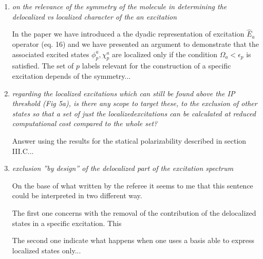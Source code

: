 \documentclass[11pt,a4paper]{article}
\newcommand{\op}[1]{\hat {#1}}
\begin{document}
\begin{enumerate}
 \item \emph{on the relevance of the symmetry of the molecule in determining the delocalized vs localized character of the an excitation}
 
 In the paper we have introduced a the dyadic representation of excitation $\op E_a$ operator (eq. 16) and we have presented an argument to
 demonstrate that the associated excited states $\phi_p^a,\chi_p^a$ are localized only if the condition $\Omega_a<\epsilon_p$ is satisfied. 
 The set of $p$ labels relevant for the construction of a specific excitation depends of the symmetry...
 
 
 \item \emph{regarding the localized excitations which can still be found above the IP threshold (Fig 5a), is there any scope to target these, to the exclusion of other states so that a set of just the localizedexcitations can be calculated at reduced computational cost compared to the whole set?}

 
 Answer using the results for the statical polarizability described in section III.C...
 
 \item \emph{exclusion ''by design'' of the delocalized part of the excitation spectrum}
 
 On the base of what written by the referee it seems to me that this sentence could be interpreted in two different way. 
 
 The first one concerns with the removal of the contribution of the delocalized states in a specific excitation. This  
 
 The second one indicate what happens when one uses a basis able to express localized states only...
 
 
 
\end{enumerate}




\end{document}
